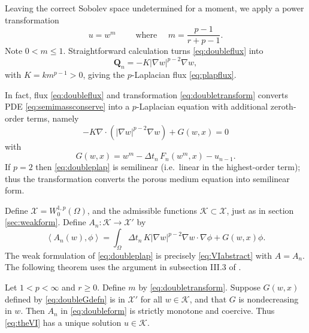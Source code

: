 \documentclass[final,leqno,onefignum,onetabnum]{siamltex1213bueler}
\newcommand\bQ{\mathbf{Q}}
\newcommand{\Div}{\nabla\cdot}
\renewcommand{\grad}{\nabla}
\newcommand{\ip}[2]{\ensuremath{\left<#1,#2\right>}}
\begin{document}
Leaving the correct Sobolev space undetermined for a moment, we apply a power transformation
\begin{equation}
	u = w^m \qquad \text{ where } \quad m = \frac{p-1}{r+p-1}. \label{eq:doubletransform}
\end{equation}
Note $0 < m \le 1$.  Straightforward calculation turns \eqref{eq:doubleflux} into
\begin{equation}
	\bQ_n = - K |\grad w|^{p-2} \grad w, \label{eq:doublenewflux}
\end{equation}
with $K=k m^{p-1}>0$, giving the $p$-Laplacian flux \eqref{eq:plapflux}.

In fact, flux \eqref{eq:doubleflux} and transformation  \eqref{eq:doubletransform} converts PDE \eqref{eq:semimassconserve} into a $p$-Laplacian equation with additional zeroth-order terms, namely
\begin{equation}
    - K \Div\left(|\grad w|^{p-2} \grad w\right) + G(w,x) = 0  \label{eq:doubleplap}
\end{equation}
with
\begin{equation}
   G(w,x) = w^m - \Delta t_n\, F_n(w^m,x) - u_{n-1}. \label{eq:doubleGdefn}
\end{equation}
If $p=2$ then \eqref{eq:doubleplap} is semilinear (i.e.~linear in the highest-order term); thus the transformation converts the porous medium equation into semilinear form.

Define $\mathcal{X} = W_0^{1,p}(\Omega)$, and the admissible functions $\mathcal{K}\subset \mathcal{X}$, just as in section \ref{sec:weakform}.  Define $A_n: \mathcal{K} \to \mathcal{X}'$ by
\begin{equation}
\ip{A_n(w)}{\phi} = \int_\Omega \Delta t_n\, K |\grad w|^{p-2} \grad w\cdot \grad \phi + G(w,x)\phi. \label{eq:doubleform}
\end{equation}
The weak formulation of \eqref{eq:doubleplap} is precisely \eqref{eq:VIabstract} with $A=A_n$.  The following theorem uses the argument in subsection III.3 of \cite{KinderlehrerStampacchia1980}.

\begin{theorem}
Let $1<p<\infty$ and $r\ge 0$.  Define $m$ by \eqref{eq:doubletransform}.  Suppose $G(w,x)$ defined by \eqref{eq:doubleGdefn} is in $\mathcal{X}'$ for all $w\in\mathcal{K}$, and that $G$ is nondecreasing in $w$.  Then $A_n$ in \eqref{eq:doubleform} is strictly monotone and coercive.  Thus \eqref{eq:theVI} has a unique solution $u\in\mathcal{K}$.
\end{theorem}
\end{document}
